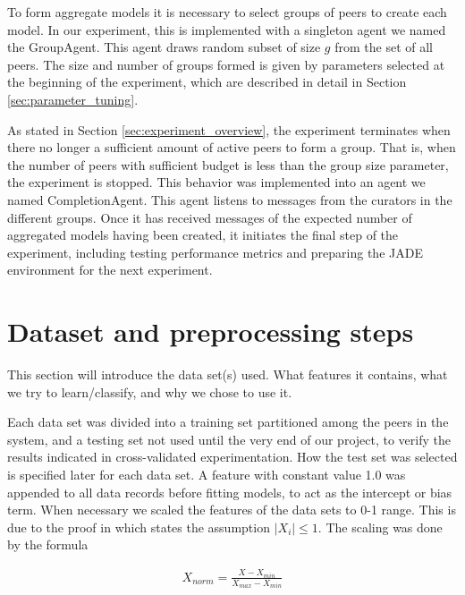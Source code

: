 To form aggregate models it is necessary to select groups of peers to create each model. In our experiment, this is implemented with a singleton agent we named the GroupAgent. This agent draws random subset of size $g$ from the set of all peers. The size and number of groups formed is given by parameters selected at the beginning of the experiment, which are described in detail in Section \ref{sec:parameter_tuning}. 

As stated in Section \ref{sec:experiment_overview},  the experiment terminates when there no longer a sufficient amount of active peers to form a group. That is, when the number of peers with sufficient budget is less than the group size parameter, the experiment is stopped. This behavior was implemented into an agent we named CompletionAgent. This agent listens to messages from the curators in the different groups. Once it has received messages of the expected number of aggregated models having been created, it initiates the final step of the experiment, including testing performance metrics and preparing the JADE environment for the next experiment. 


\section{Dataset and preprocessing steps}
\label{sec:data sets}
This section will introduce the data set(s) used. What features it contains, what we try to learn/classify, and why we chose to use it.

Each data set was divided into a training set partitioned among the peers in the system, and a testing set not used until the very end of our project, to verify the results indicated in cross-validated experimentation. How the test set was selected is specified later for each data set.
A feature with constant value 1.0 was appended to all data records before fitting models, to act as the intercept or bias term. When necessary we scaled the features of the data sets to 0-1 range. This is due to the proof in \citep{chaudhuri2009logistic} which states the assumption $|X_i|\leq 1$. The scaling was done by the formula

\begin{eqnarray}
X_{norm} = \frac{X-X_{min}}{X_{max} - X_{min}}
\end{eqnarray}

